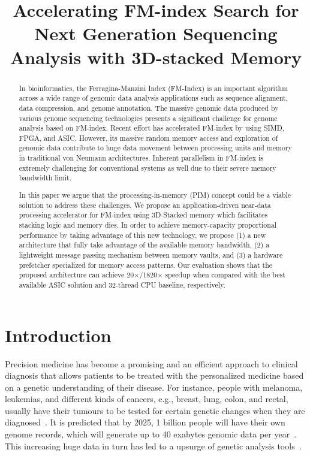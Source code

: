 \documentclass[9pt,conference]{IEEEtran}
\begin{document}
\title{Accelerating FM-index Search for Next Generation Sequencing Analysis with 3D-stacked Memory}
\maketitle

\begin{abstract}
In bioinformatics, the Ferragina-Manzini Index (FM-Index) is an important algorithm across a wide range of genomic data analysis applications such as sequence alignment, data compression, and genome annotation. The massive genomic data produced by various genome sequencing technologies presents a significant challenge for genome analysis based on FM-index. 
Recent effort has accelerated FM-index by using SIMD, FPGA, and ASIC. However, its massive random memory access and exploration of genomic data contribute to huge data movement between processing units and memory in traditional von Neumann architectures.
Inherent parallelism in FM-index is extremely challenging for conventional systems as well due to their severe memory bandwidth limit.

In this paper we argue that the processing-in-memory (PIM) concept could be a viable solution to address these challenges.
We propose an application-driven near-data processing accelerator for FM-index using 3D-Stacked memory which facilitates stacking logic and memory dies. 
In order to achieve memory-capacity proportional performance by taking advantage of this new technology, we propose (1) a new architecture that fully take advantage of the available memory bandwidth, (2) a lightweight message passing mechanism between memory vaults, and (3) a hardware prefetcher specialized for memory access patterns. 
Our evaluation shows that the proposed architecture can achieve 20$\times$/1820$\times$ speedup when compared with the best available ASIC solution and 32-thread CPU baseline, respectively.
\end{abstract}

\section{Introduction}
Precision medicine has become a promising and an efficient approach to clinical diagnosis that allows patients to be treated with the personalized medicine based on a genetic understanding of their disease. For instance, people with melanoma, leukemias, and different kinds of cancers, e.g., breast, lung, colon, and rectal, usually have their tumours to be tested for certain genetic changes when they are  diagnosed~\cite{shendure2008next,chang2016smem,cong2017aim}. 
It is predicted that by 2025, 1 billion people will have their own genome records, which will generate up to 40 exabytes genomic data per year~\cite{stephens2015big}. 
This increasing huge data in turn has led to a upsurge of genetic analysis tools~\cite{}.
\end{document}
